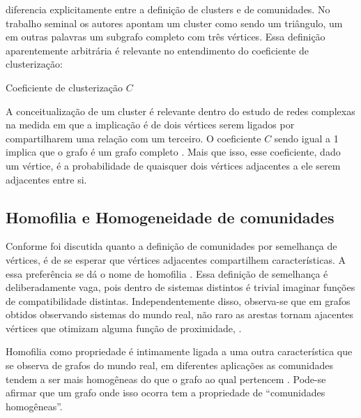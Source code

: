 \documentclass[notes.tex]{subfiles}
\begin{document}
 diferencia explicitamente entre a definição de clusters e de comunidades.
No trabalho seminal os autores apontam um cluster como sendo um triângulo, um em outras palavras um subgrafo completo com três vértices.
Essa definição aparentemente arbitrária é relevante no entendimento do coeficiente de clusterização:

\begin{quadro}[htb]
\caption{\label{qua:coecl}Coeficiente de clusterização $C$}

    \begin{equasion}
    \end{equasion}

\end{quadro}

A conceitualização de um cluster é relevante dentro do estudo de redes complexas na medida em que a implicação é de dois vértices serem ligados por compartilharem uma relação com um terceiro.
O coeficiente $C$ sendo igual a 1 implica que o grafo é um grafo completo \cite{girvan2002community}.
Mais que isso, esse coeficiente, dado um vértice, é a probabilidade de quaisquer dois vértices adjacentes a ele serem adjacentes entre si.

\subsection{Homofilia e Homogeneidade de comunidades}

Conforme foi discutida quanto a definição de comunidades por semelhança de vértices, é de se esperar que vértices adjacentes compartilhem características.
A essa preferência se dá o nome de homofilia \cite{akoglu2009rtg}.
Essa definição de semelhança é deliberadamente vaga, pois dentro de sistemas distintos é trivial imaginar funções de compatibilidade distintas.
Independentemente disso, observa-se que em grafos obtidos observando sistemas do mundo real, não raro as arestas tornam ajacentes vértices que otimizam alguma função de proximidade, \cite{largeron2015generating}.

Homofilia como propriedade é intimamente ligada a uma outra característica que se observa de grafos do mundo real, em diferentes aplicações as comunidades tendem a ser mais homogêneas do que o grafo ao qual pertencem \cite{largeron2015generating}.
Pode-se afirmar que um grafo onde isso ocorra tem a propriedade de ``comunidades homogêneas''.
\end{document}
